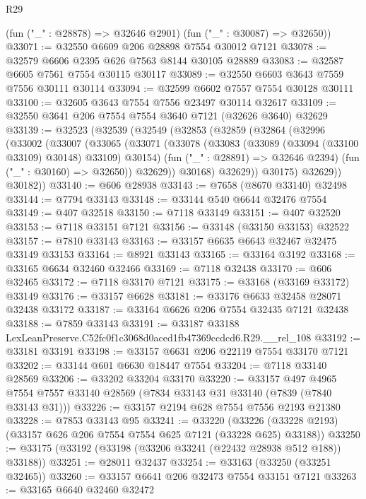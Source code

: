 \begin{lexlean}{R29}
\begin{coremodule}
      (fun ("_" : @28878) => @32646 @2901)
      (fun ("_" : @30087) => @32650))
@33071 := @32550 @6609 @206 @28898 @7554 @30012 @7121
@33078 := @32579 @6606 @2395 @626 @7563 @8144 @30105 @28889
@33083 := @32587 @6605 @7561 @7554 @30115 @30117
@33089 := @32550 @6603 @3643 @7559 @7556 @30111 @30114
@33094 := @32599 @6602 @7557 @7554 @30128 @30111
@33100 := @32605 @3643 @7554 @7556 @23497 @30114 @32617
@33109 := @32550 @3641 @206 @7554 @7554 @3640 @7121 (@32626 @3640) @32629
@33139 := @32523
    (@32539
      (@32549
        (@32853
          (@32859
            (@32864
              (@32996
                (@33002
                  (@33007
                    (@33065
                      (@33071
                        (@33078
                          (@33083 (@33089 (@33094 (@33100 @33109) @30148) @33109) @30154)
                          (fun ("_" : @28891) => @32646 @2394)
                          (fun ("_" : @30160) => @32650))
                        @32629))
                    @30168)
                  @32629))
              @30175)
            @32629))
        @30182))
@33140 := @606 @28938
@33143 := @7658 (@8670 @33140) @32498
@33144 := @7794 @33143
@33148 := @33144 @540 @6644 @32476 @7554
@33149 := @407 @32518
@33150 := @7118 @33149
@33151 := @407 @32520
@33153 := @7118 @33151 @7121
@33156 := @33148 (@33150 @33153) @32522
@33157 := @7810 @33143
@33163 := @33157 @6635 @6643 @32467 @32475 @33149 @33153
@33164 := @8921 @33143
@33165 := @33164 @3192
@33168 := @33165 @6634 @32460 @32466
@33169 := @7118 @32438
@33170 := @606 @32465
@33172 := @7118 @33170 @7121
@33175 := @33168 (@33169 @33172) @33149
@33176 := @33157 @6628
@33181 := @33176 @6633 @32458 @28071 @32438 @33172
@33187 := @33164 @6626 @206 @7554 @32435 @7121 @32438
@33188 := @7859 @33143
@33191 := @33187 @33188 LexLeanPreserve.C52fc0f1c3068d0aced1fb47369ccdcd6.R29.__rel_108
@33192 := @33181 @33191
@33198 := @33157 @6631 @206 @22119 @7554 @33170 @7121
@33202 := @33144 @601 @6630 @18447 @7554
@33204 := @7118 @33140 @28569
@33206 := @33202 @33204 @33170
@33220 := @33157
    @497
    @4965
    @7554
    @7557
    @33140
    @28569
    (@7834 @33143 @31 @33140 (@7839 (@7840 @33143 @31)))
@33226 := @33157 @2194 @628 @7554 @7556 @2193 @21380
@33228 := @7853 @33143 @95
@33241 := @33220
    (@33226 (@33228 @2193) (@33157 @626 @206 @7554 @7554 @625 @7121 (@33228 @625) @33188))
@33250 := @33175 (@33192 (@33198 (@33206 @33241 (@22432 @28938 @512 @188)) @33188))
@33251 := @28011 @32437
@33254 := @33163 (@33250 (@33251 @32465))
@33260 := @33157 @6641 @206 @32473 @7554 @33151 @7121
@33263 := @33165 @6640 @32460 @32472

\end{coremodule}
\end{lexlean}
